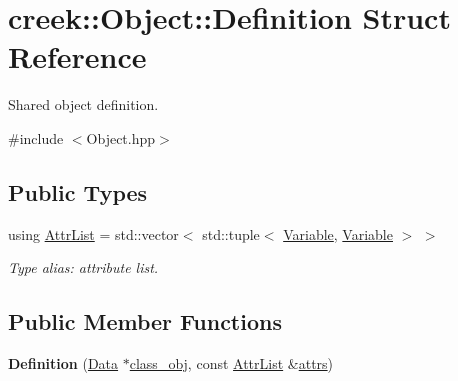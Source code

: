 \hypertarget{structcreek_1_1_object_1_1_definition}{}\section{creek\+:\+:Object\+:\+:Definition Struct Reference}
\label{structcreek_1_1_object_1_1_definition}


Shared object definition.  




{\ttfamily \#include $<$Object.\+hpp$>$}

\subsection*{Public Types}
\begin{DoxyCompactItemize}
\item 
using \hyperlink{structcreek_1_1_object_1_1_definition_a0c8683f346c620b025f8f7297fd414f8}{Attr\+List} = std\+::vector$<$ std\+::tuple$<$ \hyperlink{classcreek_1_1_variable}{Variable}, \hyperlink{classcreek_1_1_variable}{Variable} $>$ $>$\hypertarget{structcreek_1_1_object_1_1_definition_a0c8683f346c620b025f8f7297fd414f8}{}\label{structcreek_1_1_object_1_1_definition_a0c8683f346c620b025f8f7297fd414f8}

\begin{DoxyCompactList}\small\item\em Type alias\+: attribute list. \end{DoxyCompactList}\end{DoxyCompactItemize}
\subsection*{Public Member Functions}
\begin{DoxyCompactItemize}
\item 
{\bfseries Definition} (\hyperlink{classcreek_1_1_data}{Data} $\ast$\hyperlink{structcreek_1_1_object_1_1_definition_a1d4cac6d01cf40ef1130615000e20dfb}{class\+\_\+obj}, const \hyperlink{structcreek_1_1_object_1_1_definition_a0c8683f346c620b025f8f7297fd414f8}{Attr\+List} \&\hyperlink{structcreek_1_1_object_1_1_definition_a5c7f72922d0f1fcabc7d7e9f9250a5ae}{attrs})\hypertarget{structcreek_1_1_object_1_1_definition_a3f3c31a0915eeb2a0356f855212fbc78}{}\label{structcreek_1_1_object_1_1_definition_a3f3c31a0915eeb2a0356f855212fbc78}

\end{DoxyCompactItemize}
